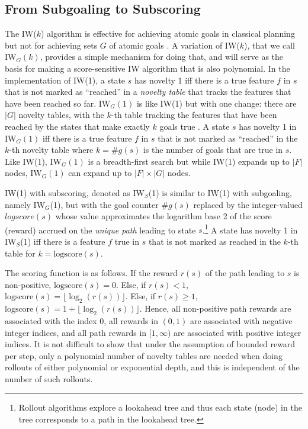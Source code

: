 \documentclass[letterpaper]{article}
\begin{document}
\subsection{From Subgoaling to Subscoring}

The IW($k$) algorithm is effective for achieving atomic goals in classical planning but
not for achieving sets $G$ of atomic goals \cite{nir:ecai2012}. A variation of IW($k$),
that we call $\textrm{IW}_G(k)$, provides a simple mechanism for doing that, and will
serve as the basis for making a score-sensitive IW algorithm that is also polynomial.
In the implementation of IW(1), a state $s$ has novelty 1 iff there is a true feature $f$
in $s$ that is not marked as ``reached''  in a \emph{novelty table} that tracks the
features that have been reached so far.
$\textrm{IW}_G(1)$ is like IW(1) but with one change: there are $|G|$ novelty tables,
with the $k$-th table tracking the features that have been reached by the states that
make exactly $k$ goals true \cite{nir:aaai2017}.
A state $s$ has novelty 1 in $\textrm{IW}_G(1)$ iff there is a true feature $f$ in $s$
that is not marked as ``reached'' in the $k$-th novelty table where  $k=\#g(s)$ is the
number of goals that are true in $s$.
Like IW(1), $\textrm{IW}_G(1)$ is a breadth-first search but while IW(1) expands up to
$|F|$ nodes,  $\textrm{IW}_G(1)$ can expand up to $|F| \times |G|$ nodes.

IW(1) with subscoring, denoted as $\textrm{IW}_S$(1) is similar to IW(1) with subgoaling,
namely $\textrm{IW}_G$(1), but with the goal counter $\#g(s)$ replaced by the integer-valued
$logscore(s)$ whose value approximates the logarithm base 2 of the score (reward) accrued
on the \emph{unique path} leading to state $s$.\footnote{Rollout algorithms explore a
lookahead tree and thus each state (node) in the tree corresponds to a path
in the lookahead tree.
}
A state has novelty 1 in $\textrm{IW}_S$(1) iff there is a feature $f$ true in $s$ that
is not marked as reached in the $k$-th table for $k=\text{logscore}(s)$.

The scoring function is as follows. If the reward $r(s)$ of the path leading
to $s$ is non-positive, $\text{logscore}(s)=0$.
Else, if $r(s)<1$, $\text{logscore}(s)=\lfloor\log_2(r(s))\rfloor$.
Else, if $r(s)\geq 1$, $\text{logscore}(s)=1 + \lfloor\log_2(r(s))\rfloor$.
Hence, all non-positive path rewards are associated with the index 0, all
rewards in $(0,1)$ are associated with negative integer indices, and all
path rewards in $[1,\infty)$ are associated with positive integer indices.
It is not difficult to show that under the assumption of bounded reward per
step, only a polynomial number of novelty tables are needed when doing rollouts
of either polynomial or exponential depth, and this is independent of the number
of such rollouts.
\end{document}
